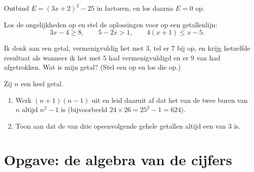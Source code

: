 \begin{exercise}[$\star\star$]\label{exo:g9:algebra:7}
Ontbind $E = (3x + 2)^2 - 25$ in factoren, en los daarna $E = 0$ op.
\end{exercise}

\begin{exercise}[$\star\star$]\label{exo:g9:algebra:8}
Los de ongelijkheden op en stel de oplossingen voor op een getallenlijn:
\[
3x - 4 \geq 8, \qquad
5 - 2x > 1, \qquad
4(x + 1) \leq x - 5 .
\]
\end{exercise}

\begin{exercise}[$\star\star$]\label{exo:g9:algebra:9}
Ik denk aan een getal, vermenigvuldig het met $3$, tel er $7$ bij op, en krijg
hetzelfde resultaat als wanneer ik het met $5$ had vermenigvuldigd en er $9$ van
had afgetrokken. Wat is mijn getal? (Stel een  op en los die op.)
\end{exercise}

\begin{exercise}[$\star\star\star$]\label{exo:g9:algebra:10}
Zij $n$ een heel getal.
\begin{enumerate}
  \item Werk $(n + 1)(n - 1)$ uit en leid daaruit af dat het  van de twee
        buren van $n$ altijd $n^2 - 1$ is (bijvoorbeeld
        $24 \times 26 = 25^2 - 1 = 624$).
  \item Toon aan dat de  van drie opeenvolgende gehele getallen altijd een
         van $3$ is.
\end{enumerate}
\end{exercise}

\section{Opgave: de algebra van de cijfers}

